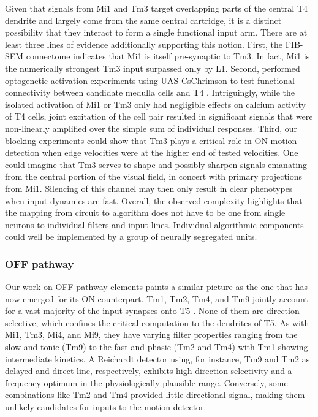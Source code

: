 Given that signals from Mi1 and Tm3 target overlapping parts of the central T4 dendrite and largely come from the same central cartridge, it is a distinct possibility that they interact to form a single functional input arm. There are at least three lines of evidence additionally supporting this notion. First, the FIB-SEM connectome indicates that Mi1 is itself pre-synaptic to Tm3. In fact, Mi1 is the numerically strongest Tm3 input surpassed only by L1. Second, \citet{Strother:2017aa} performed optogenetic activation experiments using UAS-CsChrimson to test functional connectivity between candidate medulla cells and T4 \citep{Klapoetke:2014aa}. Intriguingly, while the isolated activation of Mi1 or Tm3 only had negligible effects on calcium activity of T4 cells, joint excitation of the cell pair resulted in significant signals that were non-linearly amplified over the simple sum of individual responses. Third, our blocking experiments could show that Tm3 plays a critical role in ON motion detection when edge velocities were at the higher end of tested velocities. One could imagine that Tm3 serves to shape and possibly sharpen signals emanating from the central portion of the visual field, in concert with primary projections from Mi1. Silencing of this channel may then only result in clear phenotypes when input dynamics are fast. Overall, the observed complexity highlights that the mapping from circuit to algorithm does not have to be one from single neurons to individual filters and input lines. Individual algorithmic components could well be implemented by a group of neurally segregated units.

\subsubsection{OFF pathway}
Our work on OFF pathway elements paints a similar picture as the one that has now emerged for its ON counterpart. Tm1, Tm2, Tm4, and Tm9 jointly account for a vast majority of the input synapses onto T5 \citep{Shinomiya:2014dx}. None of them are direction-selective, which confines the critical computation to the dendrites of T5. As with Mi1, Tm3, Mi4, and Mi9, they have varying filter properties ranging from the slow and tonic (Tm9) to the fast and phasic (Tm2 and Tm4) with Tm1 showing intermediate kinetics. A Reichardt detector using, for instance, Tm9 and Tm2 as delayed and direct line, respectively, exhibits high direction-selectivity and a frequency optimum in the physiologically plausible range. Conversely, some combinations like Tm2 and Tm4 provided little directional signal, making them unlikely candidates for inputs to the motion detector.

